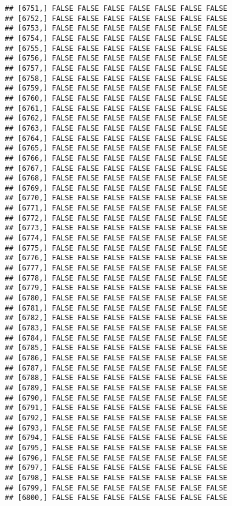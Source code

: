 \documentclass[
]{article}
\begin{document}
\begin{verbatim}
## [6751,] FALSE FALSE FALSE FALSE FALSE FALSE FALSE
## [6752,] FALSE FALSE FALSE FALSE FALSE FALSE FALSE
## [6753,] FALSE FALSE FALSE FALSE FALSE FALSE FALSE
## [6754,] FALSE FALSE FALSE FALSE FALSE FALSE FALSE
## [6755,] FALSE FALSE FALSE FALSE FALSE FALSE FALSE
## [6756,] FALSE FALSE FALSE FALSE FALSE FALSE FALSE
## [6757,] FALSE FALSE FALSE FALSE FALSE FALSE FALSE
## [6758,] FALSE FALSE FALSE FALSE FALSE FALSE FALSE
## [6759,] FALSE FALSE FALSE FALSE FALSE FALSE FALSE
## [6760,] FALSE FALSE FALSE FALSE FALSE FALSE FALSE
## [6761,] FALSE FALSE FALSE FALSE FALSE FALSE FALSE
## [6762,] FALSE FALSE FALSE FALSE FALSE FALSE FALSE
## [6763,] FALSE FALSE FALSE FALSE FALSE FALSE FALSE
## [6764,] FALSE FALSE FALSE FALSE FALSE FALSE FALSE
## [6765,] FALSE FALSE FALSE FALSE FALSE FALSE FALSE
## [6766,] FALSE FALSE FALSE FALSE FALSE FALSE FALSE
## [6767,] FALSE FALSE FALSE FALSE FALSE FALSE FALSE
## [6768,] FALSE FALSE FALSE FALSE FALSE FALSE FALSE
## [6769,] FALSE FALSE FALSE FALSE FALSE FALSE FALSE
## [6770,] FALSE FALSE FALSE FALSE FALSE FALSE FALSE
## [6771,] FALSE FALSE FALSE FALSE FALSE FALSE FALSE
## [6772,] FALSE FALSE FALSE FALSE FALSE FALSE FALSE
## [6773,] FALSE FALSE FALSE FALSE FALSE FALSE FALSE
## [6774,] FALSE FALSE FALSE FALSE FALSE FALSE FALSE
## [6775,] FALSE FALSE FALSE FALSE FALSE FALSE FALSE
## [6776,] FALSE FALSE FALSE FALSE FALSE FALSE FALSE
## [6777,] FALSE FALSE FALSE FALSE FALSE FALSE FALSE
## [6778,] FALSE FALSE FALSE FALSE FALSE FALSE FALSE
## [6779,] FALSE FALSE FALSE FALSE FALSE FALSE FALSE
## [6780,] FALSE FALSE FALSE FALSE FALSE FALSE FALSE
## [6781,] FALSE FALSE FALSE FALSE FALSE FALSE FALSE
## [6782,] FALSE FALSE FALSE FALSE FALSE FALSE FALSE
## [6783,] FALSE FALSE FALSE FALSE FALSE FALSE FALSE
## [6784,] FALSE FALSE FALSE FALSE FALSE FALSE FALSE
## [6785,] FALSE FALSE FALSE FALSE FALSE FALSE FALSE
## [6786,] FALSE FALSE FALSE FALSE FALSE FALSE FALSE
## [6787,] FALSE FALSE FALSE FALSE FALSE FALSE FALSE
## [6788,] FALSE FALSE FALSE FALSE FALSE FALSE FALSE
## [6789,] FALSE FALSE FALSE FALSE FALSE FALSE FALSE
## [6790,] FALSE FALSE FALSE FALSE FALSE FALSE FALSE
## [6791,] FALSE FALSE FALSE FALSE FALSE FALSE FALSE
## [6792,] FALSE FALSE FALSE FALSE FALSE FALSE FALSE
## [6793,] FALSE FALSE FALSE FALSE FALSE FALSE FALSE
## [6794,] FALSE FALSE FALSE FALSE FALSE FALSE FALSE
## [6795,] FALSE FALSE FALSE FALSE FALSE FALSE FALSE
## [6796,] FALSE FALSE FALSE FALSE FALSE FALSE FALSE
## [6797,] FALSE FALSE FALSE FALSE FALSE FALSE FALSE
## [6798,] FALSE FALSE FALSE FALSE FALSE FALSE FALSE
## [6799,] FALSE FALSE FALSE FALSE FALSE FALSE FALSE
## [6800,] FALSE FALSE FALSE FALSE FALSE FALSE FALSE

\end{verbatim}
\end{document}
